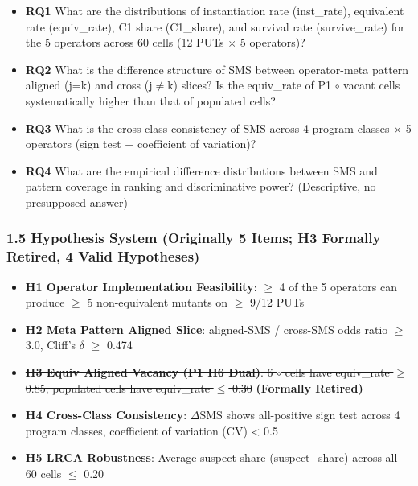 \documentclass[review,12pt,authoryear]{elsarticle}
\providecommand{\tightlist}{\setlength{\itemsep}{0pt}\setlength{\parskip}{0pt}}
\begin{document}
\begin{itemize}
\tightlist
\item
  \textbf{RQ1} What are the distributions of instantiation rate
  (inst\_rate), equivalent rate (equiv\_rate), C1 share (C1\_share), and
  survival rate (survive\_rate) for the 5 operators across 60 cells (12
  PUTs $\times$ 5 operators)?
\item
  \textbf{RQ2} What is the difference structure of SMS between
  operator-meta pattern aligned (j=k) and cross (j$\neq$k) slices? Is the
  equiv\_rate of P1 $\circ$ vacant cells systematically higher than that of \textbullet\textbullet
  populated cells?
\item
  \textbf{RQ3} What is the cross-class consistency of SMS across 4
  program classes $\times$ 5 operators (sign test + coefficient of variation)?
\item
  \textbf{RQ4} What are the empirical difference distributions between
  SMS and pattern coverage in ranking and discriminative power?
  (Descriptive, no presupposed answer)
\end{itemize}

\subsubsection{1.5 Hypothesis System (Originally 5 Items; H3 Formally
Retired, 4 Valid
Hypotheses)}\label{hypothesis-system-originally-5-items-h3-formally-retired-4-valid-hypotheses}

\begin{itemize}
\tightlist
\item
  \textbf{H1 Operator Implementation Feasibility}: $\geq$ 4 of the 5
  operators can produce $\geq$ 5 non-equivalent mutants on $\geq$ 9/12 PUTs
\item
  \textbf{H2 Meta Pattern Aligned Slice}: aligned-SMS / cross-SMS odds
  ratio $\geq$ 3.0, Cliff's $\delta$ $\geq$ 0.474
\item
  \st{\textbf{H3 Equiv Aligned Vacancy (P1 H6 Dual)}: 6 $\circ$ cells have
  equiv\_rate $\geq$ 0.85; populated cells have equiv\_rate $\leq$ 0.30}
  \textbf{(Formally Retired)}
\item
  \textbf{H4 Cross-Class Consistency}: $\Delta$SMS shows all-positive sign test
  across 4 program classes, coefficient of variation (CV) \textless{}
  0.5
\item
  \textbf{H5 LRCA Robustness}: Average suspect share (suspect\_share)
  across all 60 cells $\leq$ 0.20
\end{itemize}
\end{document}
